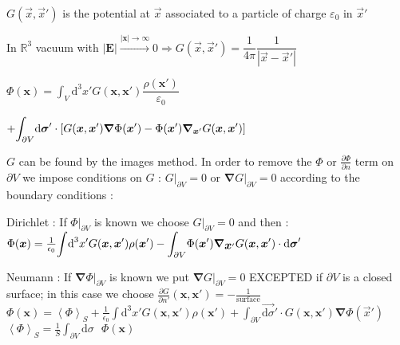 $G(\vec{x},\vec{x}')$ is the potential at $\vec{x}$ associated to a particle of charge $\varepsilon_0$ in $\vec{x}'$
\item In $\mathbb{R}^3$ vacuum with $|\boldsymbol{E}| \overset{|\boldsymbol{x}|\to \infty}{\longrightarrow} 0 \Rightarrow G(\vec{x},\vec{x}') = \dfrac{1}{4\pi}\dfrac{1}{|\vec{x} - \vec{x}'|}$\\ 

\item $\Phi(\boldsymbol{x}) = \displaystyle{\int_V} \text{d}^3 x' G(\boldsymbol{x}, \boldsymbol{x}')\dfrac{\rho(\boldsymbol{x}')}{\varepsilon_0}$ 

$+ \displaystyle{\int_{\partial V}} \boldsymbol{\textrm{d} \sigma}' \cdot \left[G(\boldsymbol{x}, \boldsymbol{x}')\boldsymbol{\nabla}\Phi(\boldsymbol{x}')-\Phi(\boldsymbol{x}')\boldsymbol{\nabla}_{\boldsymbol{x}'}G(\boldsymbol{x}, \boldsymbol{x}')\right]$

$G$ can be found by the images method. In order to remove the $\Phi$ or $\frac{\partial \Phi}{\partial n}$ term on $\partial V$ we impose conditions on $G$ : $G|_{\partial V}=0$ or  $\boldsymbol{\nabla}G|_{\partial V}=0$ according to the boundary conditions :

\item Dirichlet : If $\Phi|_{\partial V}$ is known we choose $G|_{\partial V} =0$ and then :
\\
$\Phi(\boldsymbol{x}) =\frac{1}{\epsilon_0} \displaystyle{\int} \text{d}^3x' G(\boldsymbol{x}, \boldsymbol{x}')\rho(\boldsymbol{x}') - \displaystyle{\int_{\partial V}} \Phi(\mbox{\boldmath$x$}') \mbox{\boldmath$\nabla$}_{\mbox{\boldmath$x$}'} G(\mbox{\boldmath$x$},\mbox{\boldmath$x$}') \cdot \mbox{\boldmath$\textrm{d} \sigma$}'$
\item Neumann : If $\boldsymbol{\nabla}\Phi|_{\partial V}$ is known we put $\boldsymbol{\nabla} G |_{\partial V}=0$ EXCEPTED if $\partial V$ is a closed surface; in this case we choose
$\frac{\partial G}{\partial n'}(\boldsymbol{x}, \boldsymbol{x}')= -\frac{1}{\text{surface}}$
\\
$\Phi(\boldsymbol{x}) = \left\langle \Phi \right\rangle _S + \frac{1}{\epsilon_0}\displaystyle{\int} \text{d}^3x' G(\boldsymbol{x}, \boldsymbol{x}')\rho(\boldsymbol{x}')+\displaystyle{\int_{\partial V}} \vec{\text{d}\sigma}' \cdot G(\boldsymbol{x}, \boldsymbol{x}')\boldsymbol{\nabla}\Phi(\vec{x}')$
\\
$\left\langle \Phi \right\rangle _S = \frac{1}{S}\displaystyle{\int_{\partial V}} \text{d}\sigma \text{ } \Phi(\boldsymbol{x})$

